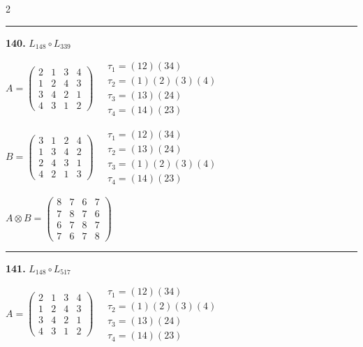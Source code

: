 \begin{multicols}{2}
\vspace{0.3em}
\hrule
\vspace{0.3em}

\noindent\textbf{140.} $L_{148} \circ L_{339}$

$A = \begin{pmatrix} 2 & 1 & 3 & 4 \\ 1 & 2 & 4 & 3 \\ 3 & 4 & 2 & 1 \\ 4 & 3 & 1 & 2 \end{pmatrix} \quad \begin{matrix} \tau_{1}=(1 2)(3 4) \\ \tau_{2}=(1)(2)(3)(4) \\ \tau_{3}=(1 3)(2 4) \\ \tau_{4}=(1 4)(2 3) \end{matrix}$

$B = \begin{pmatrix} 3 & 1 & 2 & 4 \\ 1 & 3 & 4 & 2 \\ 2 & 4 & 3 & 1 \\ 4 & 2 & 1 & 3 \end{pmatrix} \quad \begin{matrix} \tau_{1}=(1 2)(3 4) \\ \tau_{2}=(1 3)(2 4) \\ \tau_{3}=(1)(2)(3)(4) \\ \tau_{4}=(1 4)(2 3) \end{matrix}$

$A \otimes B = \begin{pmatrix} 8 & 7 & 6 & 7 \\ 7 & 8 & 7 & 6 \\ 6 & 7 & 8 & 7 \\ 7 & 6 & 7 & 8 \end{pmatrix}$

\vspace{0.3em}
\hrule
\vspace{0.3em}

\noindent\textbf{141.} $L_{148} \circ L_{517}$

$A = \begin{pmatrix} 2 & 1 & 3 & 4 \\ 1 & 2 & 4 & 3 \\ 3 & 4 & 2 & 1 \\ 4 & 3 & 1 & 2 \end{pmatrix} \quad \begin{matrix} \tau_{1}=(1 2)(3 4) \\ \tau_{2}=(1)(2)(3)(4) \\ \tau_{3}=(1 3)(2 4) \\ \tau_{4}=(1 4)(2 3) \end{matrix}$


\end{multicols}
